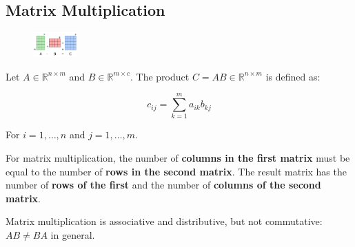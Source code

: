 
\subsection{Matrix Multiplication}

\begin{figure}[H]
  \begin{center}
    \includegraphics[width=0.15\textwidth]{media/Matrix_multiplication_qtl1.png}
  \end{center}
\end{figure}

Let \( A \in \mathbb{R}^{n \times m} \) and \( B \in \mathbb{R}^{m \times c} \). The product \( C = AB \in \mathbb{R}^{n \times m} \) is defined as:

\begin{equation}
  c_{ij} = \sum_{k=1}^{m} a_{ik} b_{kj}
\end{equation}

For \( i = 1, \ldots, n \) and \( j = 1, \ldots, m \).

For matrix multiplication, the number of \textbf{columns in the first matrix} must be equal to the number of \textbf{rows in the second matrix}. The result matrix has the number of \textbf{rows of the first} and the number of \textbf{columns of the second matrix}.

Matrix multiplication is associative and distributive, but not commutative: \( AB \neq BA \) in general.
